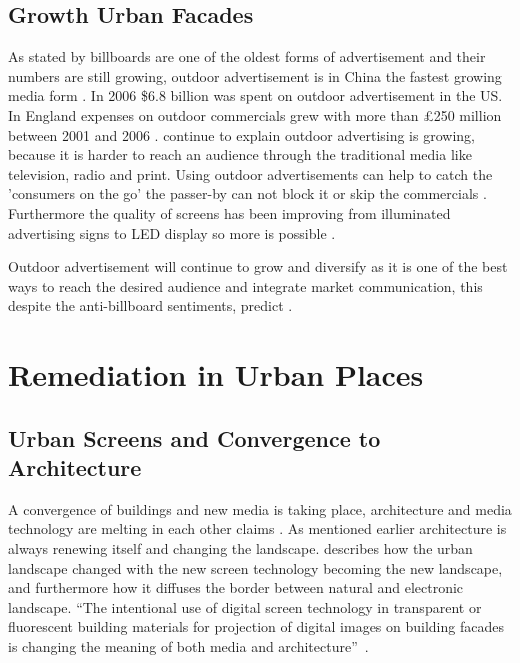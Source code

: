 \documentclass[a4paper, 11pt]{article}
\begin{document}
\subsection{Growth Urban Facades} 
As stated by \cite{outdoor2009} billboards are one of the oldest forms of advertisement and their numbers are still growing, outdoor advertisement is in China the fastest growing media form \citep{outdoor2009}. In 2006 \$6.8 billion was spent on outdoor advertisement in the US. In England expenses on outdoor commercials grew with more than \pounds 250 million between 2001 and 2006 \citep{outdoor2009}. \cite{outdoor2009} continue to explain outdoor advertising is growing, because it is harder to reach an audience through the traditional media like television, radio and print. Using outdoor advertisements can help to catch the 'consumers on the go' the passer-by can not block it or skip the commercials \citep{outdoor2009}. Furthermore the quality of screens has been improving from illuminated advertising signs to LED display so more is possible \citep{outdoor2009}.

Outdoor advertisement will continue to grow and diversify as it is one of the best ways to reach the desired audience and integrate market communication, this despite the anti-billboard sentiments, predict \cite{outdoor2009}.

\section{Remediation in Urban Places}



\subsection{Urban Screens and Convergence to Architecture}

A convergence of buildings and new media is taking place, architecture and media technology are melting in each other claims \cite{Slaatta2006}. As mentioned earlier architecture is always renewing itself and changing the landscape. \cite{Slaatta2006} describes how the urban landscape changed with the new screen technology becoming the new landscape, and furthermore how it diffuses the border between natural and electronic landscape. “The intentional use of digital screen technology in transparent or fluorescent building materials for projection of digital images on building facades is changing the meaning of both media and architecture” \citep[P.1]{Slaatta2006}.
\end{document}
